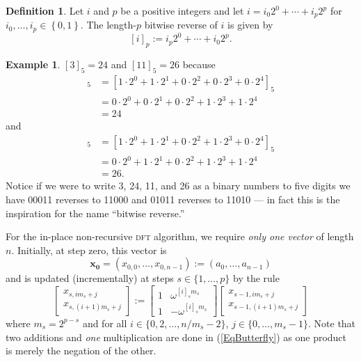 \documentclass[12pt]{article}
\theoremstyle{definition}
\newcommand{\cbrac}[1]{\left\{ #1 \right\}}
\newcommand{\x}{\boldsymbol{x}}
\newcommand{\0}{\mathbf{0}}
\theoremstyle{theorem}
\theoremstyle{definition}
\newtheorem*{definition}{Definition}
\newtheorem*{example}{Example}
\newcommand{\xs}[1]{\mathbf{x_{#1}}}
\begin{document}
\begin{definition}
Let $i$ and $p$ be a positive integers and let $i = i_0 2^0 + \cdots + i_p 2^p$ for $i_0,\ldots,i_p \in \cbrac{0,1}$. The length-$p$ bitwise reverse of $i$ is given by
$$ [i]_p := i_p 2^0 + \cdots + i_{0} 2^p.$$
\end{definition}


\begin{example} $[3]_5 = 24$ and $[11]_5 = 26$ because
\begin{align*}
[3]_5 &= [1\cdot 2^0 + 1\cdot 2^1 + 0 \cdot 2^2 + 0 \cdot 2^3 + 0 \cdot 2^4]_5 \\
      &= 0 \cdot 2^0 + 0\cdot 2^1 + 0 \cdot 2^2 + 1 \cdot 2^3 + 1 \cdot 2^4\\
      &= 24
\end{align*}
and
\begin{align*}
[11]_5 &= [1\cdot 2^0 + 1\cdot 2^1 + 0 \cdot 2^2 + 1 \cdot 2^3 + 0 \cdot 2^4]_5 \\
      &= 0 \cdot 2^0 + 1\cdot 2^1 + 0 \cdot 2^2 + 1 \cdot 2^3 + 1 \cdot 2^4\\
      &= 26.
\end{align*} 
Notice if we were to write 3, 24, 11, and 26 as a binary numbers to five digits we have 00011 reverses to 11000 and 01011 reverses to 11010 --- in fact this is the inspiration for the name ``bitwise reverse.''
\end{example}

For the in-place non-recursive \textsc{dft} algorithm, we require \emph{only one vector} of length $n$. Initially, at step zero, this vector is
$$\xs{0} = (x_{0,0}, \ldots, x_{0,n-1}) := (a_0, \ldots, a_{n-1})$$
and is updated (incrementally) at steps $s \in \{ 1 , \ldots, p \}$ by the rule
\begin{equation}
\left[\begin{array}{c}x_{s,im_s+j} \\x_{s,(i+1)m_s+j}\end{array}\right]:=\left[\begin{array}{cr}1 & \omega^{[i]_sm_s} \\1 & -\omega^{[i]_sm_s}\end{array}\right]\left[\begin{array}{c}x_{s-1,im_s+j} \\x_{s-1,(i+1)m_s+j}\end{array}\right]
\label{EqButterfly}
\end{equation}
where $m_s = 2^{p-s}$ and for all $i \in \{0, 2, \ldots, n/m_s-2\}$,  $j \in \{0,\ldots,m_s-1\}$. Note that two additions and \emph{one} multiplication are done in (\ref{EqButterfly}) as one product is merely the negation of the other.\medskip
\end{document}
